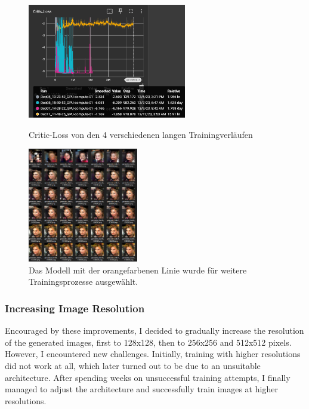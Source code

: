 \documentclass[a4paper, 12pt]{article}
\begin{document}
\begin{figure}[ht]
\centering
\begin{minipage}[t]{0.45\textwidth}
\centering
\includegraphics[height=5cm, keepaspectratio]{./img/alle_modelle.png}
\caption{Critic-Loss von den 4 verschiedenen langen Trainingverläufen}
\label{fig:critic_loss}
\end{minipage}
\hfill %
\begin{minipage}[t]{0.45\textwidth}
\centering
\includegraphics[height=5cm, keepaspectratio]{./img/epochs.png}
\caption{Das Modell mit der orangefarbenen Linie wurde für weitere Trainingsprozesse ausgewählt.}
\label{fig:epochs}
\end{minipage}
\end{figure}

\subsubsection{Increasing Image Resolution}
Encouraged by these improvements, I decided to gradually increase the resolution of the generated images, first to 128x128, then to 256x256 and 512x512 pixels. However, I encountered new challenges. Initially, training with higher resolutions did not work at all, which later turned out to be due to an unsuitable architecture. After spending weeks on unsuccessful training attempts, I finally managed to adjust the architecture and successfully train images at higher resolutions.
\end{document}
